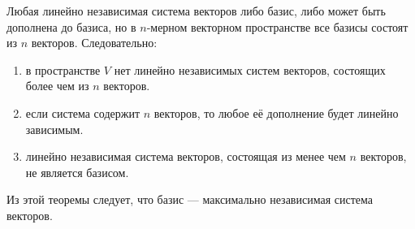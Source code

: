 \begin{Proof}
	Любая линейно независимая система векторов либо базис, либо может быть дополнена до базиса, но в $n$-мерном векторном пространстве все базисы состоят из $n$ векторов. Следовательно:\begin{enumerate}
		\item в пространстве $V$ нет линейно независимых систем векторов, состоящих более чем из $n$ векторов.
		\item если система содержит $n$ векторов, то любое её дополнение будет линейно зависимым.
		\item линейно независимая система векторов, состоящая из менее чем $n$ векторов, не является базисом.
\end{enumerate}\end{Proof}

Из этой теоремы следует, что базис --- максимально независимая система векторов.









